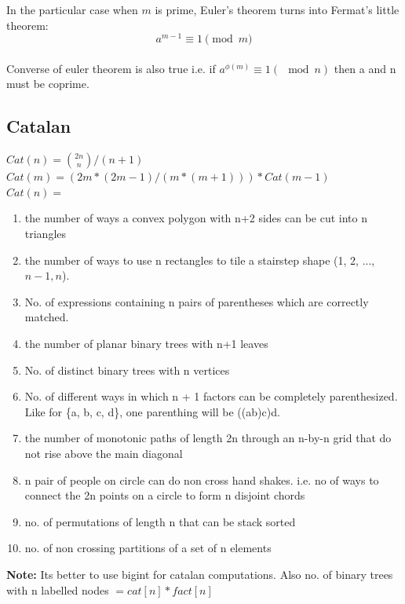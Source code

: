 \documentclass[8pt, a4paper, oneside, twocolumn]{extarticle}
\begin{document}
In the particular case when $m$ is prime, Euler's theorem turns into Fermat's little theorem: $$a^{m - 1} \equiv 1 \pmod m$$
\\Converse of euler theorem is also true i.e. if $a^{\phi(m)} \equiv 1 (\mod n)$ then a and n must be coprime.
\subsection{Catalan}
$Cat(n) = \binom{2n}{n} / (n + 1)$
\\$Cat(m) = (2m*(2m - 1)/(m*(m + 1))) * Cat(m - 1)$
\\$Cat(n) = $\begin{enumerate}
    \item the number of ways a convex polygon with n+2 sides can be cut into n triangles
    \item the number of ways to use n rectangles to tile a stairstep shape (1, 2, ..., $n-1, n$).
    \item No. of expressions containing n pairs of parentheses which are correctly matched.
    \item the number of planar binary trees with n+1 leaves
    \item No. of distinct binary trees with n vertices
    \item No. of different ways in which n + 1 factors can be completely parenthesized. Like for \{a, b, c, d\}, one parenthing will be ((ab)c)d.
    \item the number of monotonic paths of length 2n through an n-by-n grid that do not rise above the main diagonal
    \item n pair of people on circle can do non cross hand shakes. i.e. no of ways to connect the 2n points on a circle to form n disjoint chords
    \item no. of permutations of length n that can be stack sorted
    \item no. of non crossing partitions of a set of n elements
\end{enumerate}
\textbf{Note: }Its better to use bigint for catalan computations. Also no. of binary trees with n labelled nodes $= cat[n] * fact[n]$
\end{document}

